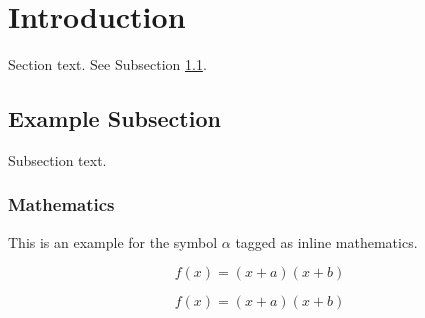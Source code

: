 \section{Introduction}
\label{sec1}
Section text. See Subsection \ref{subsec1}.

\subsection{Example Subsection}
\label{subsec1}

Subsection text.


\subsubsection{Mathematics}
This is an example for the symbol $\alpha$ tagged as inline mathematics.

\begin{equation}
f(x) = (x+a)(x+b)
\end{equation}

\begin{equation*}
f(x) = (x+a)(x+b)
\end{equation*}

